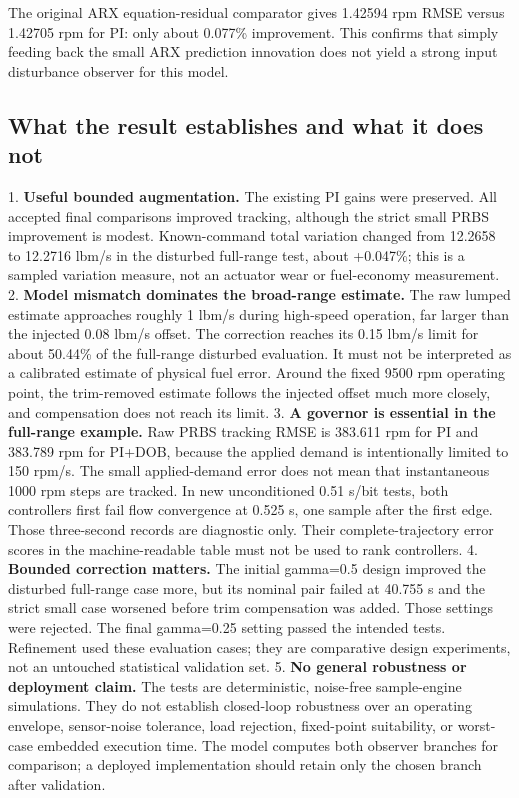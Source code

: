 The original ARX equation-residual comparator gives 1.42594 rpm RMSE versus
1.42705 rpm for PI: only about 0.077\% improvement. This confirms that simply
feeding back the small ARX prediction innovation does not yield a strong input
disturbance observer for this model.

\subsection{What the result establishes and what it does not}

1. \textbf{Useful bounded augmentation.} The existing PI gains were preserved. All
accepted final comparisons improved tracking, although the strict small PRBS
improvement is modest. Known-command total variation changed from 12.2658
to 12.2716 lbm/s in the disturbed full-range test, about +0.047\%; this is a
sampled variation measure, not an actuator wear or fuel-economy measurement.
2. \textbf{Model mismatch dominates the broad-range estimate.} The raw lumped estimate
approaches roughly 1 lbm/s during high-speed operation, far larger than the
injected 0.08 lbm/s offset. The correction reaches its 0.15 lbm/s limit for
about 50.44\% of the full-range disturbed evaluation. It must not be interpreted
as a calibrated estimate of physical fuel error. Around the fixed 9500 rpm
operating point, the trim-removed estimate follows the injected offset much
more closely, and compensation does not reach its limit.
3. \textbf{A governor is essential in the full-range example.} Raw PRBS tracking RMSE
is 383.611 rpm for PI and 383.789 rpm for PI+DOB, because the applied demand
is intentionally limited to 150 rpm/s. The small applied-demand error does
not mean that instantaneous 1000 rpm steps are tracked. In new unconditioned
0.51 s/bit tests, both controllers first fail flow convergence at 0.525 s,
one sample after the first edge. Those three-second records are diagnostic
only. Their complete-trajectory error scores in the machine-readable table
must not be used to rank controllers.
4. \textbf{Bounded correction matters.} The initial gamma=0.5 design improved the
disturbed full-range case more, but its nominal pair failed at 40.755 s and
the strict small case worsened before trim compensation was added. Those
settings were rejected. The final gamma=0.25 setting passed the intended
tests. Refinement used these evaluation cases; they are comparative design
experiments, not an untouched statistical validation set.
5. \textbf{No general robustness or deployment claim.} The tests are deterministic,
noise-free sample-engine simulations. They do not establish closed-loop
robustness over an operating envelope, sensor-noise tolerance, load rejection,
fixed-point suitability, or worst-case embedded execution time. The model
computes both observer branches for comparison; a deployed implementation
should retain only the chosen branch after validation.

